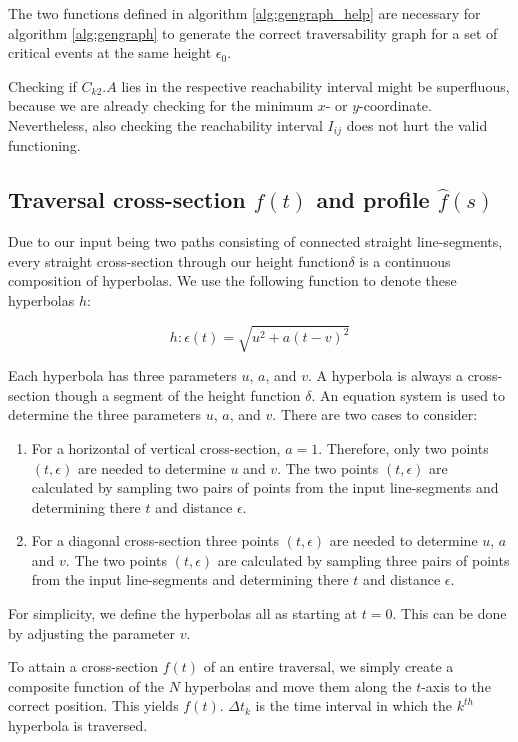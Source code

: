 The two functions defined in algorithm \ref{alg:gengraph_help} are necessary for algorithm \ref{alg:gengraph} to generate the correct traversability graph for a set of critical events at the same height $\epsilon_0$.

Checking if $C_{k2}.A$ lies in the respective reachability interval might be superfluous, because we are already checking for the minimum $x$- or $y$-coordinate. Nevertheless, also checking the reachability interval $I_{ij}$ does not hurt the valid functioning.


\subsection{Traversal cross-section $f(t)$ and profile $\hat{f}(s)$}\label{sec:trav_csp}

Due to our input being two paths consisting of connected straight line-segments, every straight cross-section through our height function$\delta$ is a continuous composition of hyperbolas. We use the following function to denote these hyperbolas $h$:

$$h: \epsilon(t) = \sqrt{u^2 + a(t - v)^2}$$

Each hyperbola has three parameters $u$, $a$, and $v$. A hyperbola is always a cross-section though a segment of the height function $\delta$. An equation system is used to determine the three parameters $u$, $a$, and $v$. There are two cases to consider:

\begin{enumerate}
	\item For a horizontal of vertical cross-section, $a = 1$. Therefore, only two points $(t, \epsilon)$ are needed to determine $u$ and $v$. The two points $(t, \epsilon)$ are calculated by sampling two pairs of points from the input line-segments and determining there $t$ and distance $\epsilon$.
	\item For a diagonal cross-section three points $(t, \epsilon)$ are needed to determine $u$, $a$ and $v$. The two points $(t, \epsilon)$ are calculated by sampling three pairs of points from the input line-segments and determining there $t$ and distance $\epsilon$.
\end{enumerate}

For simplicity, we define the hyperbolas all as starting at $t=0$. This can be done by adjusting the parameter $v$.

To attain a cross-section $f(t)$ of an entire traversal, we simply create a composite function of the $N$ hyperbolas and move them along the $t$-axis to the correct position. This yields $f(t)$. ${\Delta t}_k$ is the time interval in which the $k^{th}$ hyperbola is traversed.

